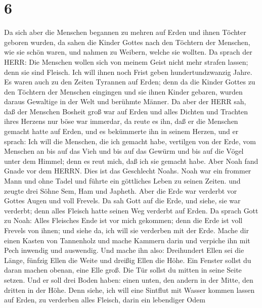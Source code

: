 \hypertarget{section-5}{%
\section{6}\label{section-5}}

 Da sich aber die Menschen begannen zu mehren auf Erden und
ihnen Töchter geboren wurden,  da sahen die Kinder Gottes
nach den Töchtern der Menschen, wie sie schön waren, und nahmen zu
Weibern, welche sie wollten.  Da sprach der HERR: Die
Menschen wollen sich von meinem Geist nicht mehr strafen lassen; denn
sie sind Fleisch. Ich will ihnen noch Frist geben hundertundzwanzig
Jahre.  Es waren auch zu den Zeiten Tyrannen auf Erden; denn
da die Kinder Gottes zu den Töchtern der Menschen eingingen und sie
ihnen Kinder gebaren, wurden daraus Gewaltige in der Welt und berühmte
Männer.  Da aber der HERR sah, daß der Menschen Bosheit groß
war auf Erden und alles Dichten und Trachten ihres Herzens nur böse war
immerdar,  da reute es ihn, daß er die Menschen gemacht
hatte auf Erden, und es bekümmerte ihn in seinem Herzen, 
und er sprach: Ich will die Menschen, die ich gemacht habe, vertilgen
von der Erde, vom Menschen an bis auf das Vieh und bis auf das Gewürm
und bis auf die Vögel unter dem Himmel; denn es reut mich, daß ich sie
gemacht habe.  Aber Noah fand Gnade vor dem HERRN.
 Dies ist das Geschlecht Noahs. Noah war ein frommer Mann
und ohne Tadel und führte ein göttliches Leben zu seinen Zeiten.
 und zeugte drei Söhne Sem, Ham und Japheth. 
Aber die Erde war verderbt vor Gottes Augen und voll Frevels.
 Da sah Gott auf die Erde, und siehe, sie war verderbt;
denn alles Fleisch hatte seinen Weg verderbt auf Erden.  Da
sprach Gott zu Noah: Alles Fleisches Ende ist vor mich gekommen; denn
die Erde ist voll Frevels von ihnen; und siehe da, ich will sie
verderben mit der Erde.  Mache dir einen Kasten von
Tannenholz und mache Kammern darin und verpiche ihn mit Pech inwendig
und auswendig.  Und mache ihn also: Dreihundert Ellen sei
die Länge, fünfzig Ellen die Weite und dreißig Ellen die Höhe.
 Ein Fenster sollst du daran machen obenan, eine Elle groß.
Die Tür sollst du mitten in seine Seite setzen. Und er soll drei Boden
haben: einen unten, den andern in der Mitte, den dritten in der Höhe.
 Denn siehe, ich will eine Sintflut mit Wasser kommen
lassen auf Erden, zu verderben alles Fleisch, darin ein lebendiger Odem
